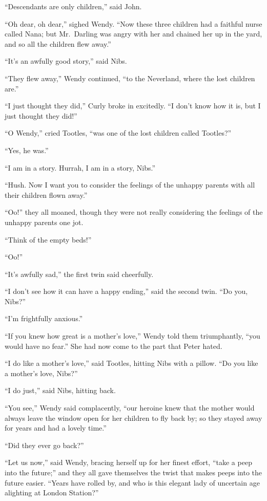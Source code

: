 ``Descendants are only children,'' said John.

``Oh dear, oh dear,'' sighed Wendy. ``Now these three children had a
faithful nurse called Nana; but Mr.\ Darling was angry with her and
chained her up in the yard, and so all the children flew away.''

``It's an awfully good story,'' said Nibs.

``They flew away,'' Wendy continued, ``to the Neverland, where the lost
children are.''

``I just thought they did,'' Curly broke in excitedly. ``I don't know how
it is, but I just thought they did!''

``O Wendy,'' cried Tootles, ``was one of the lost children called
Tootles?''

``Yes, he was.''

``I am in a story. Hurrah, I am in a story, Nibs.''

``Hush. Now I want you to consider the feelings of the unhappy parents
with all their children flown away.''

``Oo!'' they all moaned, though they were not really considering the
feelings of the unhappy parents one jot.

``Think of the empty beds!''

``Oo!''

``It's awfully sad,'' the first twin said cheerfully.

``I don't see how it can have a happy ending,'' said the second twin. ``Do
you, Nibs?''

``I'm frightfully anxious.''

``If you knew how great is a mother's love,'' Wendy told them
triumphantly, ``you would have no fear.'' She had now come to the part
that Peter hated.

``I do like a mother's love,'' said Tootles, hitting Nibs with a pillow.
``Do you like a mother's love, Nibs?''

``I do just,'' said Nibs, hitting back.

``You see,'' Wendy said complacently, ``our heroine knew that the mother
would always leave the window open for her children to fly back by; so
they stayed away for years and had a lovely time.''

``Did they ever go back?''

``Let us now,'' said Wendy, bracing herself up for her finest effort,
``take a peep into the future;'' and they all gave themselves the twist
that makes peeps into the future easier. ``Years have rolled by, and who
is this elegant lady of uncertain age alighting at London Station?''

